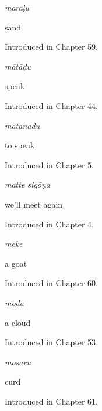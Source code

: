 \noindent\begin{minipage}[t]{\linewidth}
\raggedright
\textbf{}\enspace\emph{maraḷu}\par
\small sand\par
\footnotesize Introduced in Chapter 59.
\end{minipage}\par\medskip

\noindent\begin{minipage}[t]{\linewidth}
\raggedright
\textbf{}\enspace\emph{mātāḍu}\par
\small speak\par
\footnotesize Introduced in Chapter 44.
\end{minipage}\par\medskip

\noindent\begin{minipage}[t]{\linewidth}
\raggedright
\textbf{}\enspace\emph{mātanāḍu}\par
\small to speak\par
\footnotesize Introduced in Chapter 5.
\end{minipage}\par\medskip

\noindent\begin{minipage}[t]{\linewidth}
\raggedright
\textbf{ }\enspace\emph{matte sigōṇa}\par
\small we'll meet again\par
\footnotesize Introduced in Chapter 4.
\end{minipage}\par\medskip

\noindent\begin{minipage}[t]{\linewidth}
\raggedright
\textbf{}\enspace\emph{mēke}\par
\small a goat\par
\footnotesize Introduced in Chapter 60.
\end{minipage}\par\medskip

\noindent\begin{minipage}[t]{\linewidth}
\raggedright
\textbf{}\enspace\emph{mōḍa}\par
\small a cloud\par
\footnotesize Introduced in Chapter 53.
\end{minipage}\par\medskip

\noindent\begin{minipage}[t]{\linewidth}
\raggedright
\textbf{}\enspace\emph{mosaru}\par
\small curd\par
\footnotesize Introduced in Chapter 61.
\end{minipage}\par\medskip

